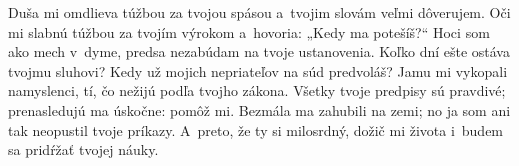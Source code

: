 Duša mi omdlieva túžbou za tvojou spásou
a~tvojim slovám veľmi dôverujem.
\versseparator
Oči mi slabnú túžbou za tvojím výrokom
a~hovoria: „Kedy ma potešíš?“
\versseparator
Hoci som ako mech v~dyme,
predsa nezabúdam na tvoje ustanovenia.
\versseparator
Koľko dní ešte ostáva tvojmu sluhovi?
Kedy už mojich nepriateľov na súd predvoláš?
\versseparator
Jamu mi vykopali namyslenci,
tí, čo nežijú podľa tvojho zákona.
\versseparator
Všetky tvoje predpisy sú pravdivé;
prenasledujú ma úskočne: pomôž mi.
\versseparator
Bezmála ma zahubili na zemi;
no ja som ani tak neopustil tvoje príkazy.
\versseparator
A~preto, že ty si milosrdný, dožič mi života
 i~budem sa pridŕžať tvojej náuky.